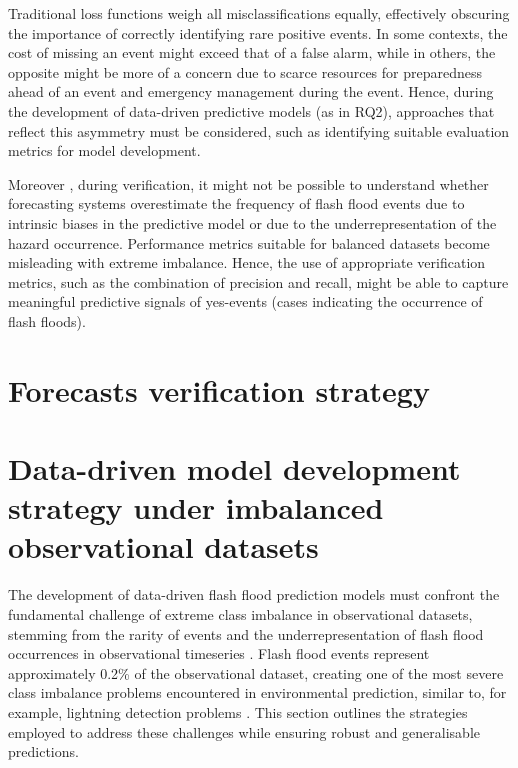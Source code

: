 Traditional  loss functions weigh all misclassifications equally, effectively obscuring the importance of correctly identifying rare positive events. In some contexts, the cost of missing an event might exceed that of a false alarm, while in others, the opposite might be more of a concern due to scarce resources for preparedness ahead of an event and emergency management during the event. Hence, during the development of data-driven predictive models (as in RQ2), approaches that reflect this asymmetry must be considered, such as identifying suitable evaluation metrics for model development. 

Moreover , during verification, it might not be possible to understand whether forecasting systems overestimate the frequency of flash flood events due to intrinsic biases in the predictive model or due to the underrepresentation of the hazard occurrence. Performance metrics suitable for balanced datasets become misleading with extreme imbalance. Hence, the use of appropriate verification metrics, such as the combination of precision and recall, might be able to capture meaningful predictive signals of yes-events (cases indicating the occurrence of flash floods).


\section{Forecasts verification strategy}
\label{experimental_design_verification_strategy}
















\section{Data-driven model development strategy under imbalanced observational datasets}
\label{experimental_design_model_dev_imbalanced_data}

The development of data-driven flash flood prediction models must confront the fundamental challenge of extreme class imbalance in observational datasets, stemming from the rarity of events and the underrepresentation of flash flood occurrences in observational timeseries \citep{Gaume_2009, Panwar_2020, Marjerison_2016}. Flash flood events represent approximately 0.2\% of the observational dataset, creating one of the most severe class imbalance problems encountered in environmental prediction, similar to, for example, lightning detection problems \citep{Cavaiola_2024}. This section outlines the strategies employed to address these challenges while ensuring robust and generalisable predictions.

